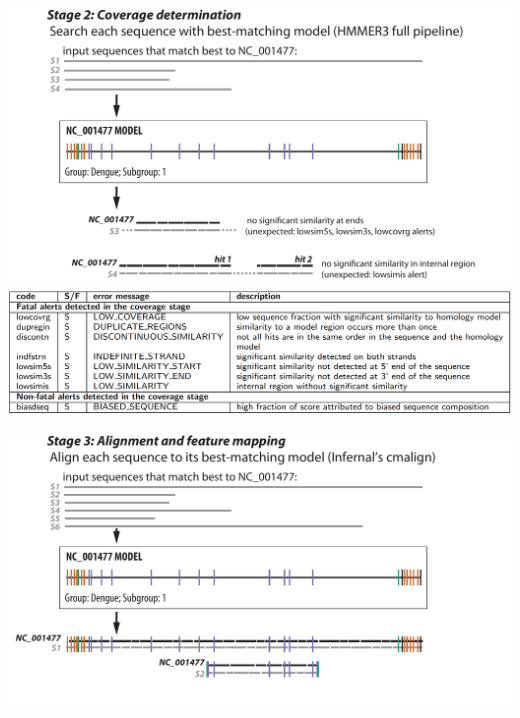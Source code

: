 \documentclass[landscape]{slides}
\begin{document}
\begin{slide}
\begin{center}

\includegraphics[width=10.5in]{figs/v-annotate-stage2-2}
\includegraphics[width=10in]{figs/ss-coverage-alert-list}
\end{center}

\vfill
\end{slide}
\begin{slide}
\begin{center}

\includegraphics[width=10.5in]{figs/v-annotate-stage3-1}
\end{center}

\vfill
\end{slide}
\end{document}
